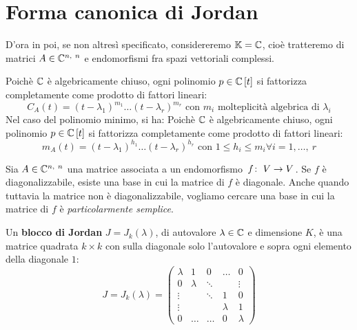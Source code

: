 \section{Forma canonica di Jordan}
D'ora in poi, se non altresì specificato, considereremo $\mathbb{K}=\mathbb{C}$, cioè tratteremo di matrici $A\in \mathbb{C}^{n,\ n}$ e endomorfismi fra spazi vettoriali complessi.
\begin{observe}
Poichè $\mathbb{C}$ è algebricamente chiuso, ogni polinomio $p\in\mathbb{C}\left[t\right]$ si fattorizza completamente come prodotto di fattori lineari:
\begin{equation}
	C_A\left(t\right)=\left(t-\lambda_1\right)^{m_1}\ldots\left(t-\lambda_r\right)^{m_r}\text{ con } m_i \text{ molteplicità algebrica di } \lambda_i
\end{equation}
Nel caso del polinomio minimo, si ha:
Poichè $\mathbb{C}$ è algebricamente chiuso, ogni polinomio $p\in\mathbb{C}\left[t\right]$ si fattorizza completamente come prodotto di fattori lineari:
\begin{equation}
	m_A\left(t\right)=\left(t-\lambda_1\right)^{h_1}\ldots\left(t-\lambda_r\right)^{h_r}\text{ con } 1\leq h_i\leq m_i \forall i=1,\ldots,\ r
\end{equation}
\end{observe}
Sia $A\in \mathbb{C}^{n,\ n}$ una matrice associata a un endomorfismo $\funz{f}{V}{V}$. Se $f$ è diagonalizzabile, esiste una base in cui la matrice di $f$ è diagonale. Anche quando tuttavia la matrice non è diagonalizzabile, vogliamo cercare una base in cui la matrice di $f$ è \textit{particolarmente semplice}.
\begin{define}
	Un \textbf{blocco di Jordan} $J=J_k\left(\lambda\right)$, di autovalore $\lambda\in\mathbb{C}$ e dimensione $K$, è una matrice quadrata $k\times k$ con sulla diagonale solo l'autovalore e sopra ogni elemento della diagonale $1$:
	\begin{equation}%
		    J=J_k\left(\lambda\right) = \left(
		\begin{array}{ccccc}
\lambda	& 1 		&  0		& \ldots 	& 0 \\
0		& \lambda 	& \ddots	& 			& \vdots\\
\vdots	&  			& \ddots	& 1 		& 0\\
\vdots	& 			&   		& \lambda 	& 1\\
0		&  \dots  	&  \dots 	&  0 		& \lambda
		\end{array}
		\right)
	\end{equation}
\end{define}
